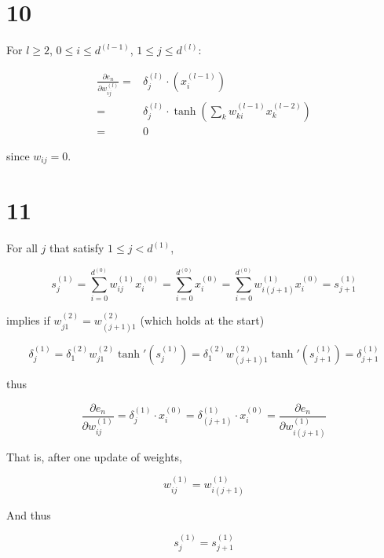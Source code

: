 \documentclass[fleqn,a4paper,12pt]{article}
\begin{document}
\section*{10}

For $l \geq 2$, $0 \leq i \leq d^{(l - 1)}$, $1 \leq j \leq d^{(l)}$:

\begin{align*}
  \frac{\partial e_n}{\partial w_{ij}^{(l)}}
  =& \delta^{(l)}_j \cdot (x_{i}^{(l - 1)})  \\
  =& \delta^{(l)}_j \cdot \tanh(\sum_k w_{ki}^{(l-1)} x_k^{(l - 2)}) \\
  =& 0
\end{align*}

since $w_{ij} = 0$.


\section*{11}

For all $j$ that satisfy $1 \leq j < d^{(1)}$,


\begin{equation*}
    s^{(1)}_j
    = \sum_{i=0}^{d^{(0)}} w_{ij}^{(1)} x_i^{(0)}
    = \sum_{i=0}^{d^{(0)}}  x_i^{(0)}
    = \sum_{i=0}^{d^{(0)}} w_{i(j + 1)}^{(1)} x_i^{(0)}
    = s^{(1)}_{j+1} 
\end{equation*}

implies if $w_{j1}^{(2)} = w_{(j + 1)1}^{(2)}$ (which holds at the start)

\begin{equation*}
  \delta_j^{(1)}
  = \delta_1^{(2)} w_{j1}^{(2)} \tanh'(s_j^{(1)})
  = \delta_1^{(2)} w_{(j + 1)1}^{(2)} \tanh'(s_{j + 1}^{(1)})
  = \delta_{j + 1}^{(1)} 
\end{equation*}

thus

\begin{equation*}
  \frac{\partial e_n}{\partial w_{ij}^{(1)}}
  = \delta_j^{(1)} \cdot x_i^{(0)} 
  = \delta_{(j + 1)}^{(1)} \cdot x_i^{(0)} 
  = \frac{\partial e_n}{\partial w_{i(j + 1)}^{(1)}}
\end{equation*}

That is, after one update of weights,

\begin{equation*}
  w_{ij}^{(1)} = w_{i(j + 1)}^{(1)}
\end{equation*}


And thus

\begin{equation*}
s^{(1)}_j = s^{(1)}_{j + 1}
\end{equation*}
\end{document}
